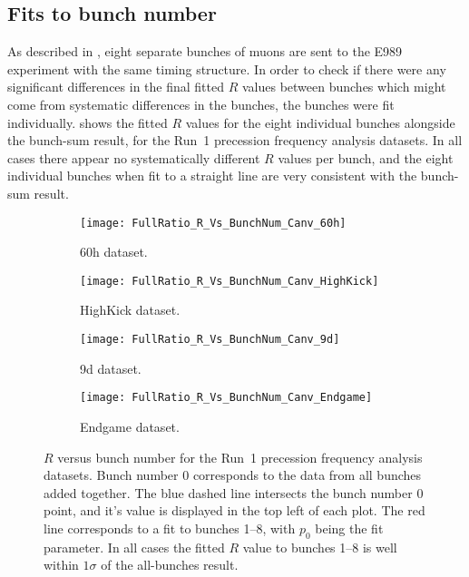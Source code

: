 \subsection{Fits to bunch number}


As described in , eight separate bunches of muons are sent to the E989 experiment with the same timing structure. In order to check if there were any significant differences in the final fitted $R$ values between bunches which might come from systematic differences in the bunches, the bunches were fit individually.  shows the fitted $R$ values for the eight individual bunches alongside the bunch-sum result, for the Run~1 precession frequency analysis datasets. In all cases there appear no systematically different $R$ values per bunch, and the eight individual bunches when fit to a straight line are very consistent with the bunch-sum result.



\begin{figure}[]
\centering
    \begin{subfigure}[]{0.45\textwidth}
        \centering
        \texttt{[image: FullRatio\_R\_Vs\_BunchNum\_Canv\_60h]}
        \caption{60h dataset.}
    \end{subfigure}%
    \begin{subfigure}[]{0.45\textwidth}
        \centering
        \texttt{[image: FullRatio\_R\_Vs\_BunchNum\_Canv\_HighKick]}
        \caption{HighKick dataset.}
    \end{subfigure}

    \begin{subfigure}[]{0.45\textwidth}
        \centering
        \texttt{[image: FullRatio\_R\_Vs\_BunchNum\_Canv\_9d]}
        \caption{9d dataset.}
    \end{subfigure}%
    \begin{subfigure}[]{0.45\textwidth}
        \centering
        \texttt{[image: FullRatio\_R\_Vs\_BunchNum\_Canv\_Endgame]}
        \caption{Endgame dataset.}
    \end{subfigure}
\caption[$R$ versus bunch number]{$R$ versus bunch number for the Run~1 precession frequency analysis datasets. Bunch number 0 corresponds to the data from all bunches added together. The blue dashed line intersects the bunch number 0 point, and it's value is displayed in the top left of each plot. The red line corresponds to a fit to bunches 1--8, with $p_{0}$ being the fit parameter. In all cases the fitted $R$ value to bunches 1--8 is well within $1\sigma$ of the all-bunches result.}
\label{fig:bunchNum_R}
\end{figure}



